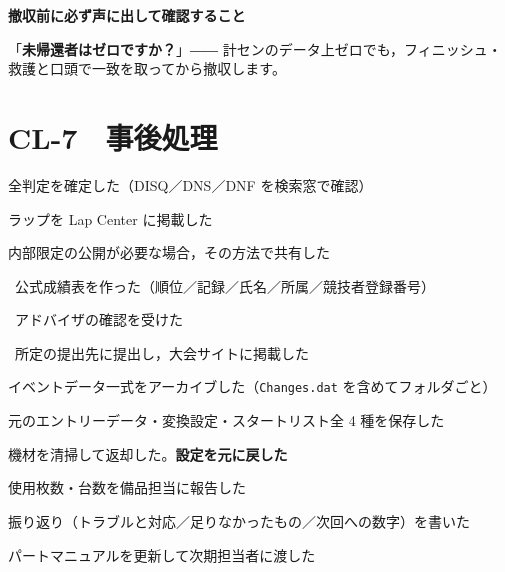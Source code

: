 \vspace{4mm}
\noindent\begin{tcolorbox}[colback=notebg,colframe=notefr,boxrule=0.6pt,arc=2pt]
{\sffamily\bfseries 撤収前に必ず声に出して確認すること}\par\vspace{1mm}
「\textbf{未帰還者はゼロですか？}」――
計センのデータ上ゼロでも，フィニッシュ・救護と口頭で一致を取ってから撤収します。
\end{tcolorbox}

\ckfoot

\clearpage
\section*{CL-7　事後処理}

\begin{cklist}
\item 全判定を確定した（DISQ／DNS／DNF を検索窓で確認）
\item ラップを Lap Center に掲載した
\item 内部限定の公開が必要な場合，その方法で共有した
\end{cklist}

\begin{cklist}
\item \tRANK\ 公式成績表を作った（順位／記録／氏名／所属／競技者登録番号）
\item \tRANK\ アドバイザの確認を受けた
\item \tRANK\ 所定の提出先に提出し，大会サイトに掲載した
\item イベントデータ一式をアーカイブした（\texttt{Changes.dat} を含めてフォルダごと）
\item 元のエントリーデータ・変換設定・スタートリスト全 4 種を保存した
\item 機材を清掃して返却した。\textbf{設定を元に戻した}
\item 使用枚数・台数を備品担当に報告した
\item 振り返り（トラブルと対応／足りなかったもの／次回への数字）を書いた
\item パートマニュアルを更新して次期担当者に渡した
\end{cklist}

\ckfoot

\clearpage
